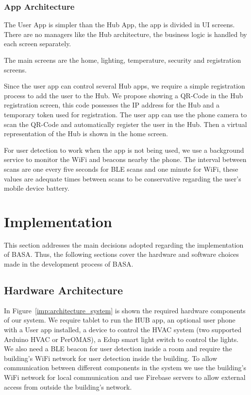 \documentclass[conference]{IEEEtran}
\begin{document}
\subsubsection{App Architecture}
The User App is simpler than the Hub App, the app is divided in \ac{UI} screens. There are no managers like the Hub architecture, the business logic is handled by each screen separately. 

The main screens are the home, lighting, temperature, security and registration screens.

Since the user app can control several Hub apps, we require a simple registration process to add the user to the Hub. We propose showing a QR-Code in the Hub registration screen, this code possesses the \ac{IP} address for the Hub and a temporary token used for registration. The user app can use the phone camera to scan the QR-Code and automatically register the user in the Hub. Then a virtual representation of the Hub is shown in the home screen.

For user detection to work when the app is not being used, we use a background service to monitor the \ac{WiFi} and beacons nearby the phone. The interval between scans are one every five seconds for \ac{BLE} scans and one minute for WiFi, these values are adequate times between scans to be conservative regarding the user's mobile device battery.



\section{Implementation}

This section addresses the main decisions adopted regarding the implementation of BASA.
Thus, the following sections cover the hardware and software choices made in the development process of BASA.

\subsection{Hardware Architecture}\label{hardware_arch_imp}

In Figure~\ref{imp:architecture_system} is shown the required hardware components of our system. We require tablet to run the HUB app, an optional user phone with a User app installed, a device to control the HVAC system (two supported Arduino HVAC or PerOMAS\cite{peromas}), a Edup smart light switch to control the lights. We also need a \ac{BLE} beacon for user detection inside a room and require the building's \ac{WiFi} network for user detection inside the building.
To allow communication between different components in the system we use the building's \ac{WiFi} network for local communication and use Firebase servers to allow external access from outside the building's network.
\end{document}
